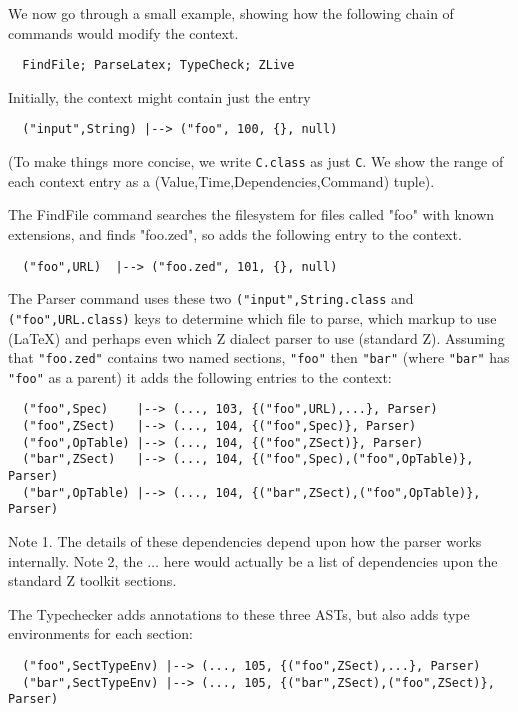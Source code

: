 \documentclass{llncs} %
\begin{document}
We now go through a small example, showing how the following
chain of commands would modify the context.
\begin{verbatim}
  FindFile; ParseLatex; TypeCheck; ZLive
\end{verbatim}

Initially, the context might contain just the entry
\begin{small}
\begin{verbatim}
  ("input",String) |--> ("foo", 100, {}, null)
\end{verbatim}
\end{small}
(To make things more concise, we write \texttt{C.class} as just \texttt{C}.
We show the range of each context entry as a (Value,Time,Dependencies,Command)
tuple). 

The FindFile command searches the filesystem for files called
"foo" with known extensions, and finds "foo.zed", so adds the
following entry to the context.
\begin{small}
\begin{verbatim}
  ("foo",URL)  |--> ("foo.zed", 101, {}, null)
\end{verbatim}
\end{small}

The Parser command uses these two \texttt{("input",String.class}
and \texttt{("foo",URL.class)} keys to determine which file
to parse, which markup to use (\LaTeX) and perhaps even which Z dialect
parser to use (standard Z).  Assuming that \texttt{"foo.zed"}
contains two named sections, \texttt{"foo"} then \texttt{"bar"}
(where \texttt{"bar"} has \texttt{"foo"} as a parent)
it adds the following entries to the context:
\begin{small}
\begin{verbatim}
  ("foo",Spec)    |--> (..., 103, {("foo",URL),...}, Parser)
  ("foo",ZSect)   |--> (..., 104, {("foo",Spec)}, Parser)
  ("foo",OpTable) |--> (..., 104, {("foo",ZSect)}, Parser)
  ("bar",ZSect)   |--> (..., 104, {("foo",Spec),("foo",OpTable)}, Parser)
  ("bar",OpTable) |--> (..., 104, {("bar",ZSect),("foo",OpTable)}, Parser)
\end{verbatim}
\end{small}
Note 1. The details of these dependencies depend upon how the
parser works internally.
Note 2, the $\ldots$ here would actually be a list of dependencies
upon the standard Z toolkit sections.

The Typechecker adds annotations to these three ASTs,
but also adds type environments for each section:
\begin{small}
\begin{verbatim}
  ("foo",SectTypeEnv) |--> (..., 105, {("foo",ZSect),...}, Parser)
  ("bar",SectTypeEnv) |--> (..., 105, {("bar",ZSect),("foo",ZSect)}, Parser)
\end{verbatim}
\end{small}
\end{document}
